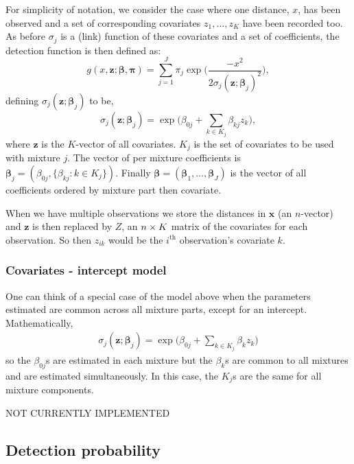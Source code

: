 For simplicity of notation, we consider the case where one distance, $x$, has been observed and a set of corresponding covariates $z_1,\dots,z_K$ have been recorded too. As before $\sigma_j$ is a (link) function of these covariates and a set of coefficients, the detection function is then defined as:
\begin{equation*}
g(x, \bm{z};\bm{\beta},\bm{\pi}) = \sum_{j=1}^J \pi_j \exp \Big( \frac{-x^2}{2 \sigma_j(\bm{z};\bm{\beta}_j)^2}\Big),
\end{equation*}
defining $\sigma_j(\bm{z};\bm{\beta}_j)$ to be,
\begin{equation*}
\sigma_j(\bm{z};\bm{\beta}_j) = \exp \Big(\beta_{0j} + \sum_{k\in K_j} \beta_{kj} z_k \Big),
\end{equation*}
where $\bm{z}$ is the $K$-vector of all covariates. $K_j$ is the set of covariates to be used with mixture $j$. The vector of per mixture coefficients is $\bm{\beta}_j=(\beta_{0j},\{ \beta_{kj} : k \in K_j\})$. Finally $\bm{\beta}=(\bm{\beta}_1,\dots,\bm{\beta}_J)$ is the vector of all coefficients ordered by mixture part then covariate.

When we have multiple observations we store the distances in $\bm{x}$ (an $n$-vector) and $\bm{z}$ is then replaced by $Z$, an $n \times K$ matrix of the covariates for each observation. So then $z_{ik}$ would be the $i^\text{th}$ observation's covariate $k$.

\subsubsection{Covariates - intercept model}

One can think of a special case of the model above when the parameters estimated are common across all mixture parts, except for an intercept.  Mathematically,
\begin{align*}
\sigma_j(\bm{z};\bm{\beta}_j) = \exp \Big(\beta_{0j} + \sum_{k\in K_j} \beta_{k} z_k \Big)
\end{align*}
so the $\beta_{0j}$s are estimated in each mixture but the $\beta_{k}$s are common to all mixtures and are estimated simultaneously. In this case, the $K_j$s are the same for all mixture components.

NOT CURRENTLY IMPLEMENTED





\subsection{Detection probability}

